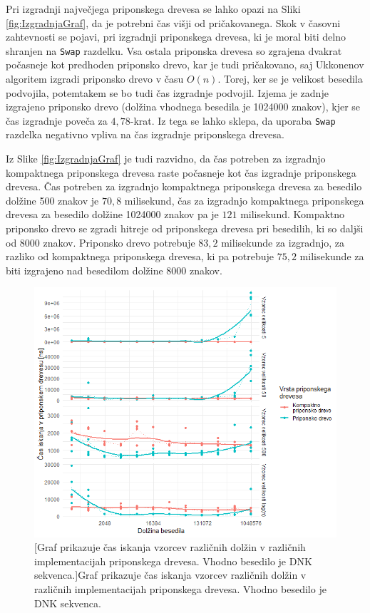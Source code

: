 \newpage
Pri izgradnji največjega priponskega drevesa se lahko opazi na Sliki \ref{fig:IzgradnjaGraf}, da je potrebni čas višji od pričakovanega. Skok v časovni zahtevnosti se pojavi, pri izgradnji priponskega drevesa, ki je moral biti delno shranjen na \verb|Swap| razdelku. Vsa ostala priponska drevesa so zgrajena dvakrat počasneje kot predhoden priponsko drevo, kar je tudi pričakovano, saj Ukkonenov algoritem izgradi priponsko drevo v času $O(n)$. Torej, ker se je velikost besedila podvojila, potemtakem se bo tudi čas izgradnje podvojil. Izjema je zadnje izgrajeno priponsko drevo (dolžina vhodnega besedila je 1024000 znakov), kjer se čas izgradnje poveča za $4,78$-krat. Iz tega se lahko sklepa, da uporaba \verb|Swap| razdelka negativno vpliva na čas izgradnje priponskega drevesa.

Iz Slike \ref{fig:IzgradnjaGraf} je tudi razvidno, da čas potreben za izgradnjo kompaktnega priponskega drevesa raste počasneje kot čas izgradnje priponskega drevesa. Čas potreben za izgradnjo kompaktnega priponskega drevesa za besedilo dolžine 500 znakov je $70,8$ milisekund, čas za izgradnjo kompaktnega priponskega drevesa za besedilo dolžine 1024000 znakov pa je $121$ milisekund. Kompaktno priponsko drevo se zgradi hitreje od priponskega drevesa pri besedilih, ki so daljši od 8000 znakov. Priponsko drevo potrebuje $83,2$ milisekunde za izgradnjo, za razliko od kompaktnega priponskega drevesa, ki pa potrebuje $75,2$ milisekunde za biti izgrajeno nad besedilom dolžine 8000 znakov.

\begin{figure}[htb]
    \includegraphics[width=\textwidth]{Slike/IskanjeNovPC.png}
    [Graf prikazuje čas iskanja vzorcev različnih dolžin v različnih implementacijah priponskega drevesa. Vhodno besedilo je DNK sekvenca.]{Graf prikazuje čas iskanja vzorcev različnih dolžin v različnih implementacijah priponskega drevesa. Vhodno besedilo je DNK sekvenca.} 
    \label{fig:IskanjeGraf}
\end{figure}

